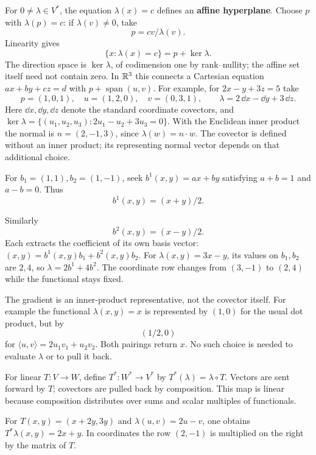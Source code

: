 \begin{example}\label{ex:affine-hyperplane}
For $0\ne\lambda\in V^*$, the equation $\lambda(x)=c$ defines an
\textbf{affine hyperplane}. Choose $p$ with $\lambda(p)=c$: if
$\lambda(v)\ne0$, take
\[
p=cv/\lambda(v).
\]
 Linearity gives
\[
\{x:\lambda(x)=c\}=p+\ker\lambda.
\]
The direction space is $\ker\lambda$, of codimension one by rank--nullity;
the affine set itself need not contain zero. In $\mathbb{R}^3$ this connects a
Cartesian equation $ax+by+cz=d$ with $p+\operatorname{span}(u,v)$.
For example, for $2x-y+3z=5$ take
\[
p=(1,0,1),\quad u=(1,2,0),\quad v=(0,3,1),\qquad
\lambda=2\,\dd x-\dd y+3\,\dd z.
\]
Here $\dd x,\dd y,\dd z$ denote the standard coordinate covectors, and
$\ker\lambda=\{(u_1,u_2,u_3):2u_1-u_2+3u_3=0\}$.
With the Euclidean inner product the normal is $n=(2,-1,3)$, since
$\lambda(w)=n\cdot w$. The covector is defined without an inner product;
its representing normal vector depends on that additional choice.
\end{example}

\begin{example}
For $b_1=(1,1),b_2=(1,-1)$, seek $b^1(x,y)=ax+by$ satisfying
$a+b=1$ and $a-b=0$. Thus
\[
b^1(x,y)=(x+y)/2.
\]

Similarly
\[
b^2(x,y)=(x-y)/2.
\]
 Each extracts the coefficient of
its own basis vector: $(x,y)=b^1(x,y)b_1+b^2(x,y)b_2$.
For $\lambda(x,y)=3x-y$, its values on $b_1,b_2$ are $2,4$, so
$\lambda=2b^1+4b^2$. The coordinate row changes from $(3,-1)$ to
$(2,4)$ while the functional stays fixed.
\end{example}
The gradient is an inner-product representative, not the covector itself.
For example the functional $\lambda(x,y)=x$ is represented by $(1,0)$
for the usual dot product, but by
\[
(1/2,0)
\]
 for
$\langle u,v\rangle=2u_1v_1+u_2v_2$. Both pairings return $x$.
No such choice is needed to evaluate $\lambda$ or to pull it back.
\begin{definition}\label{def:covector-pullback}
For linear $T:V\to W$, define $T^*:W^*\to V^*$ by
$T^*(\lambda)=\lambda\circ T$. Vectors are sent forward by $T$;
covectors are pulled back by composition. This map is linear because
composition distributes over sums and scalar multiples of functionals.
\end{definition}
For $T(x,y)=(x+2y,3y)$ and $\lambda(u,v)=2u-v$, one obtains
$T^*\lambda(x,y)=2x+y$. In coordinates the row $(2,-1)$ is multiplied
on the right by the matrix of $T$.

